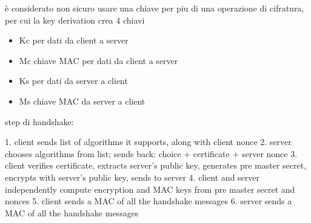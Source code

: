 \documentclass[12pt]{article}
\begin{document}
è considerato non sicuro usare una chiave per piu di una operazione  di cifratura, per cui la key derivation crea 4 chiavi
\begin{itemize}
\item Kc per dati da client a server
\item Mc  chiave MAC per dati da client a server
\item Ks per dati da server a client
\item Ms chiave MAC da server a client
\end{itemize}

step di handshake:

1. client sends list of algorithms it supports, along with
client nonce
2. server chooses algorithms from list; sends back:
choice + certificate + server nonce
3. client verifies certificate, extracts server’s public
key, generates pre master secret, encrypts with
server’s public key, sends to server
4. client and server independently compute encryption
and MAC keys from pre master secret and nonces
5. client sends a MAC of all the handshake messages
6. server sends a MAC of all the handshake messages
\end{document}
